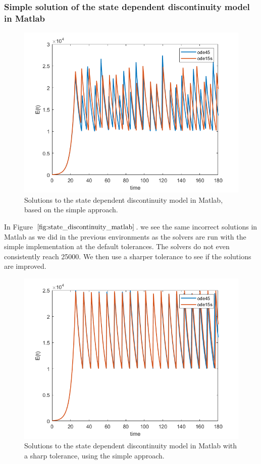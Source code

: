 \subsubsection{Simple solution of the state dependent discontinuity model in Matlab}
\begin{figure}[H]
\centering
\includegraphics[width=0.7\linewidth]{./figures/state_discontinuity_matlab}
\caption{Solutions to the state dependent discontinuity model in Matlab, based on the simple approach.}
\label{fig:state_discontinuity_matlab}
\end{figure}
In Figure $\ref{fig:state_discontinuity_matlab}$. we see the same incorrect solutions in Matlab as we did in the previous environments as the solvers are run with the simple implementation at the default tolerances. The solvers do not even consistently reach 25000. We then use a sharper tolerance to see if the solutions are improved.

\begin{figure}[h]
\centering
\includegraphics[width=0.7\linewidth]{./figures/state_discontinuity_sharp_matlab}
\caption{Solutions to the state dependent discontinuity model in Matlab with a sharp tolerance, using the simple approach.}
\label{fig:state_discontinuity_sharp_matlab}
\end{figure}

